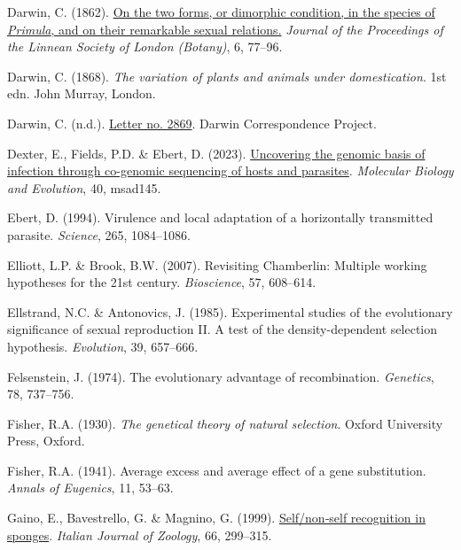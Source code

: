\documentclass[
  letterpaper,
]{book}
\newlength{\cslhangindent}
\newenvironment{CSLReferences}[2] %
 {\begin{list}{}{%
  \setlength{\itemindent}{0pt}
  \setlength{\leftmargin}{0pt}
  \setlength{\parsep}{0pt}
  \ifodd #1
   \setlength{\leftmargin}{\cslhangindent}
   \setlength{\itemindent}{-1\cslhangindent}
  \fi
  \setlength{\itemsep}{#2\baselineskip}}}
 {\end{list}}
\begin{document}
\begin{CSLReferences}{1}{0}
Darwin, C. (1862).
\href{https://doi.org/10.1111/j.1095-8312.1862.tb01218.x}{On the two
forms, or dimorphic condition, in the species of \emph{{P}rimula}, and
on their remarkable sexual relations.} \emph{Journal of the Proceedings
of the Linnean Society of London (Botany)}, 6, 77--96.

Darwin, C. (1868). \emph{The variation of plants and animals under
domestication}. 1st edn. John Murray, London.

Darwin, C. (n.d.).
\href{https://www.darwinproject.ac.uk/letter/?docId=letters/DCP-LETT-2869.xml}{Letter
no. 2869}. Darwin Correspondence Project.

Dexter, E., Fields, P.D. \& Ebert, D. (2023).
\href{https://doi.org/10.1093/molbev/msad145}{Uncovering the genomic
basis of infection through co-genomic sequencing of hosts and
parasites}. \emph{Molecular Biology and Evolution}, 40, msad145.

Ebert, D. (1994). Virulence and local adaptation of a horizontally
transmitted parasite. \emph{Science}, 265, 1084--1086.

Elliott, L.P. \& Brook, B.W. (2007). Revisiting {C}hamberlin: Multiple
working hypotheses for the 21st century. \emph{Bioscience}, 57,
608--614.

Ellstrand, N.C. \& Antonovics, J. (1985). Experimental studies of the
evolutionary significance of sexual reproduction II. A test of the
density-dependent selection hypothesis. \emph{Evolution}, 39, 657--666.

Felsenstein, J. (1974). The evolutionary advantage of recombination.
\emph{Genetics}, 78, 737--756.

Fisher, R.A. (1930). \emph{The genetical theory of natural selection}.
Oxford University Press, Oxford.

Fisher, R.A. (1941). Average excess and average effect of a gene
substitution. \emph{Annals of Eugenics}, 11, 53--63.

Gaino, E., Bavestrello, G. \& Magnino, G. (1999).
\href{https://doi.org/10.1080/11250009909356270}{Self/non‐self
recognition in sponges}. \emph{Italian Journal of Zoology}, 66,
299--315.


\end{CSLReferences}
\end{document}
